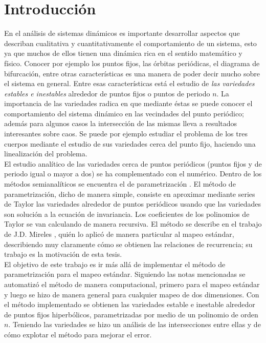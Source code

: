 
\chapter{Introducción}
En el análisis de sis\-te\-mas di\-ná\-mi\-cos es importante desarrollar aspectos que describan cualitativa y cuantitativamente el comportamiento de un sistema, esto ya que muchos de ellos tienen una dinámica rica en el sentido matemático y físico. Conocer por ejemplo los puntos fijos, las órbitas periódicas, el diagrama de bifurcación, entre otras características es una manera de poder decir mucho sobre el sistema en general. Entre esas características está el estudio de \textit{las variedades estables e inestables} alrededor de puntos fijos o puntos de periodo $n$. La importancia de las variedades radica en que mediante éstas se puede conocer el comportamiento del sistema dinámico en las vecindades del punto periódico; además para algunos casos la intersección de las mismas lleva a resultados interesantes sobre caos. Se puede por ejemplo estudiar el problema de los tres cuerpos mediante el estudio de sus variedades cerca del punto fijo, haciendo una linealización del problema. \citep{Meyer}\\


El estudio analítico de las variedades cerca de puntos periódicos (puntos fijos y de periodo igual o mayor a dos) se ha complementado con el numérico. Dentro de los métodos semianalíticos se encuentra el de parametrización \citep{Haro}. El método de pa\-ra\-me\-tri\-za\-ción, dicho de manera simple, consiste en aproximar mediante series de Taylor las variedades alrededor de puntos periódicos usando que las variedades son solución a la ecuación de invariancia. Los coeficientes de los polinomios de Taylor se van calculando de manera recursiva. El método se describe en el trabajo de J.D. Mireles \citep{Mireles}, quién  lo aplicó de manera particular al mapeo estándar, describiendo muy claramente cómo se obtienen las relaciones de recurrencia; su trabajo es la motivación de esta tesis.\\



El objetivo de este trabajo es ir más allá de implementar el método de pa\-ra\-me\-tri\-za\-ción para el mapeo estándar. Siguiendo las notas mencionadas se automatizó el método de manera computacional, primero para el mapeo estándar y luego se hizo de manera general para cualquier mapeo de dos dimensiones. Con el método implementado se obtienen las variedades estable e inestable alrededor de puntos fijos hi\-per\-bó\-li\-cos, pa\-ra\-me\-tri\-za\-das por medio de un polinomio de orden $n$.
Teniendo las variedades se hizo un análisis de las intersecciones entre ellas y de cómo explotar el método para mejorar el error.
 
